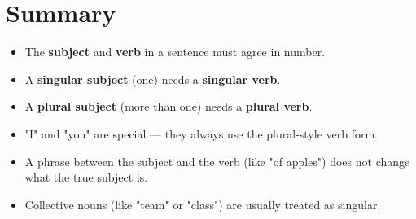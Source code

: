 \section{Summary}
\begin{summarybox}
    \begin{itemize}
        \item The \textbf{subject} and \textbf{verb} in a sentence must agree in number.
        \item A \textbf{singular subject} (one) needs a \textbf{singular verb}.
        \item A \textbf{plural subject} (more than one) needs a \textbf{plural verb}.
        \item "I" and "you" are special — they always use the plural-style verb form.
        \item A phrase between the subject and the verb (like "of apples") does not change what the true subject is.
        \item Collective nouns (like "team" or "class") are usually treated as singular.
    \end{itemize}
\end{summarybox}
